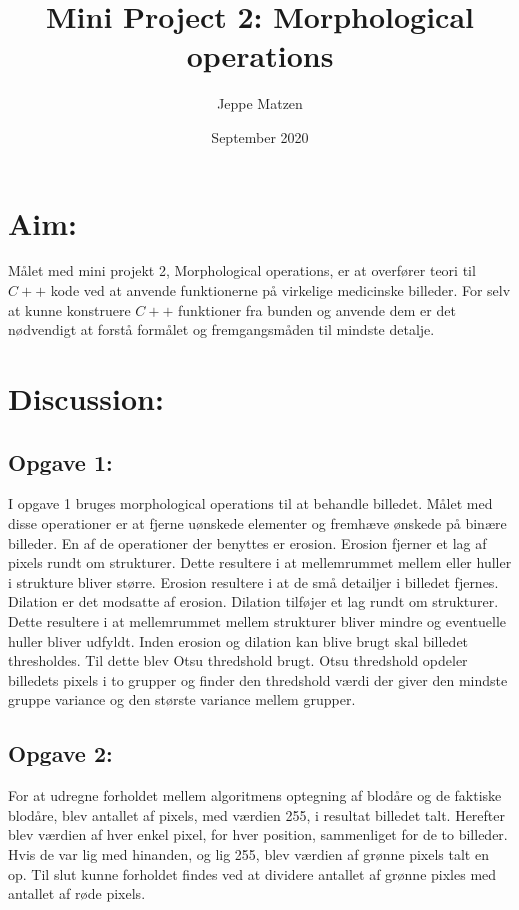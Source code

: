 \documentclass{article}
\title{Mini Project 2: Morphological operations}
\author{Jeppe Matzen}
\date{September 2020}
\begin{document}
\lstset{style=mystyle}
\maketitle

\section{Aim:}
Målet med mini projekt 2, Morphological operations, er at overfører teori til $C++$ kode ved at anvende funktionerne på virkelige medicinske billeder. \newline 
For selv at kunne konstruere $C++$ funktioner fra bunden og anvende dem er det nødvendigt at forstå formålet og fremgangsmåden til mindste detalje.  

\section{Discussion:}

\subsection{Opgave 1:}
I opgave 1 bruges morphological operations til at behandle billedet. Målet med disse operationer er at fjerne uønskede elementer og fremhæve ønskede på binære billeder. \newline
En af de operationer der benyttes er erosion. Erosion fjerner et lag af pixels rundt om strukturer. Dette resultere i at mellemrummet mellem eller huller i strukture bliver større. Erosion resultere i at de små detailjer i billedet fjernes.\newline
Dilation er det modsatte af erosion. Dilation tilføjer et lag rundt om strukturer. Dette resultere i at mellemrummet mellem strukturer bliver mindre og eventuelle huller bliver udfyldt. \newline
Inden erosion og dilation kan blive brugt skal billedet thresholdes. Til dette blev Otsu thredshold brugt.
Otsu thredshold opdeler billedets pixels i to grupper og finder den thredshold værdi der giver den mindste gruppe variance og den største variance mellem grupper.  

\subsection{Opgave 2:}
For at udregne forholdet mellem algoritmens optegning af blodåre og de faktiske
blodåre, blev antallet af pixels, med værdien 255, i resultat billedet talt.
Herefter blev værdien af hver enkel pixel, for hver position, sammenliget for de to billeder. Hvis de var lig med hinanden, og lig 255, blev værdien af grønne pixels talt en op. Til slut kunne forholdet findes ved at dividere antallet af grønne pixles med antallet af røde pixels. 
\end{document}
